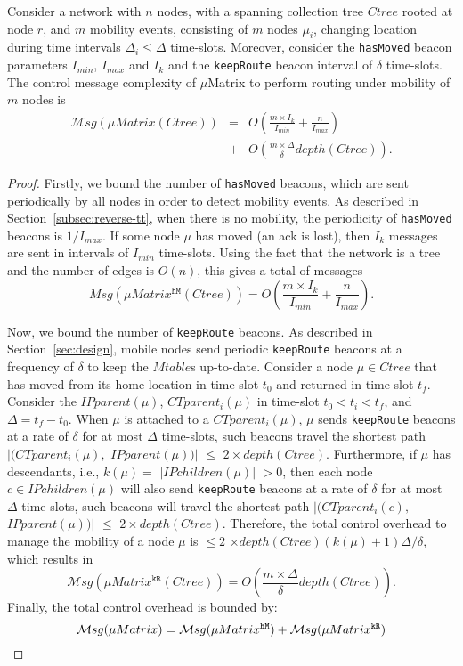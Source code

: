 \begin{theorem}\label{thm:costOverOneNode}
Consider a network with $n$ nodes, with a spanning collection tree $Ctree$ rooted at node $r$, and $m$ mobility events, consisting of $m$ nodes $\mu_i$, changing location during time intervals $\Delta_i \leq \Delta$ time-slots.
Moreover, consider the \texttt{hasMoved} beacon parameters $I_{min}$, $I_{max}$ and $I_k$ and the \texttt{keepRoute} beacon interval of $\delta$ time-slots. The control message complexity of $\mu$Matrix to perform
routing under mobility of $m$ nodes is 
\begin{eqnarray}
\mathcal{M}sg(\mu Matrix(Ctree)) &=&O\left(\frac{m\times I_k}{I_{min}} + \frac{n}{I_{max}}\right) \nonumber\\
&+& O\left(\frac{m \times \Delta}{\delta} depth(Ctree)\right).\nonumber
\end{eqnarray}
\end{theorem}
\begin{proof}
Firstly, we bound the number of \texttt{hasMoved} beacons, which are sent periodically by all nodes in order to detect mobility events. As described in Section~\ref{subsec:reverse-tt}, when there is no mobility, the periodicity of \texttt{hasMoved} beacons is $1/I_{max}$. If some node $\mu$ has moved (an ack is lost), then $I_k$ messages are sent in intervals of $I_{min}$ time-slots. Using the fact that the network is a tree and the number of edges is $O(n)$, this gives a total of messages $$Msg(\mu Matrix^{\texttt{hM}}(Ctree)) = O\left(\frac{m\times I_k}{I_{min}} + \frac{n}{I_{max}}\right).$$

Now, we bound the number of \texttt{keepRoute} beacons. As described in Section~\ref{sec:design}, mobile nodes send periodic \texttt{keepRoute} beacons at a frequency of $\delta$ to keep the $Mtable$s up-to-date. Consider a node $\mu \in Ctree$ that has moved from its home location in time-slot $t_0$ and returned in time-slot $t_f$. Consider the $IPparent(\mu)$, $CTparent_i(\mu)$ in time-slot $t_0 < t_i < t_f$, and $\Delta = t_f - t_0$. When $\mu$ is attached to a $CTparent_i(\mu)$, $\mu$ sends \texttt{keepRoute} beacons at a rate of $\delta$ for at most $\Delta$ time-slots, such beacons travel the shortest path $|(CTparent_i(\mu),$ $IPparent(\mu))|$ $\leq $ $2 \times depth(Ctree)$. Furthermore, if $\mu$ has descendants, i.e., $k(\mu) = $ $|IPchildren(\mu)|$ $ > 0$, then each node $c \in IPchildren(\mu)$ will also send \texttt{keepRoute} beacons at a rate of $\delta$ for at most $\Delta$ time-slots, such beacons will travel the shortest path $|(CTparent_i(c),$ $IPparent(\mu))|$ $\leq $ $2 \times depth(Ctree)$. Therefore, the total control overhead to manage the mobility of a node $\mu$ is $ \leq 2$ $\times depth(Ctree) (k(\mu) + 1) \Delta/\delta$, which results in $$\mathcal{M}sg(\mu Matrix^{\texttt{kR}}(Ctree))=O\left(\frac{m \times \Delta}{\delta} depth(Ctree)\right).$$ Finally, the total control overhead is bounded by: $$\mathcal{M}sg(\mu Matrix) = \mathcal{M}sg(\mu Matrix^{\texttt{hM}}) + \mathcal{M}sg(\mu Matrix^{\texttt{kR}})\qedhere$$ 
\end{proof}


